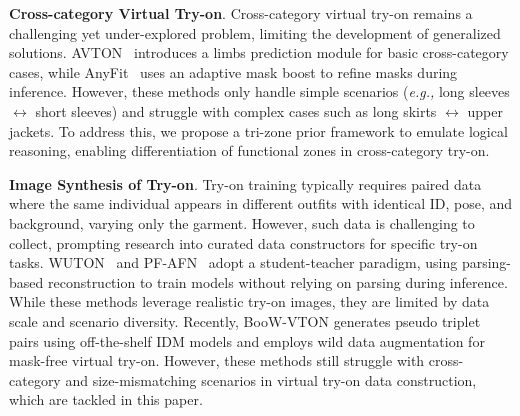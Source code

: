 \noindent\textbf{Cross-category Virtual Try-on}.
Cross-category virtual try-on remains a challenging yet under-explored problem, limiting the development of generalized solutions. AVTON~\cite{liu2024arbitrary} introduces a limbs prediction module for basic cross-category cases, while AnyFit~\cite{li2024anyfit} uses an adaptive mask boost to refine masks during inference. However, these methods only handle simple scenarios (\textit{e.g.,} long sleeves $\leftrightarrow$ short sleeves) and struggle with complex cases such as long skirts $\leftrightarrow$ upper jackets. To address this, we propose a tri-zone prior framework to emulate logical reasoning, enabling differentiation of functional zones in cross-category try-on.




\noindent\textbf{Image Synthesis of Try-on}.
Try-on training typically requires paired data where the same individual appears in different outfits with identical ID, pose, and background, varying only the garment. However, such data is challenging to collect, prompting research into curated data constructors for specific try-on tasks. WUTON~\cite{issenhuth2020not} and PF-AFN~\cite{ge2021parser} adopt a student-teacher paradigm, using parsing-based reconstruction to train models without relying on parsing during inference. While these methods leverage realistic try-on images, they are limited by data scale and scenario diversity.
%
Recently, BooW-VTON \cite{zhang2024boow} generates pseudo triplet pairs using off-the-shelf IDM models and employs wild data augmentation for mask-free virtual try-on. However, these methods still struggle with cross-category and size-mismatching scenarios in virtual try-on data construction, which are tackled in this paper.



